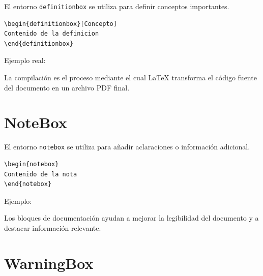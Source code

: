 El entorno \texttt{definitionbox} se utiliza para
definir conceptos importantes.

\begin{lstlisting}[caption={Uso de definitionbox},label={code:defbox}]
\begin{definitionbox}[Concepto]
Contenido de la definicion
\end{definitionbox}
\end{lstlisting}




Ejemplo real:

\begin{definitionbox}[Compilación]
La compilación es el proceso mediante el cual
\LaTeX{} transforma el código fuente del documento
en un archivo PDF final.
\end{definitionbox}




\section{NoteBox}

El entorno \texttt{notebox} se utiliza para añadir
aclaraciones o información adicional.

\begin{lstlisting}[caption={Uso de notebox},label={code:notebox}]
\begin{notebox}
Contenido de la nota
\end{notebox}
\end{lstlisting}




Ejemplo:

\begin{notebox}
Los bloques de documentación ayudan a mejorar la
legibilidad del documento y a destacar información
relevante.
\end{notebox}




\section{WarningBox}

